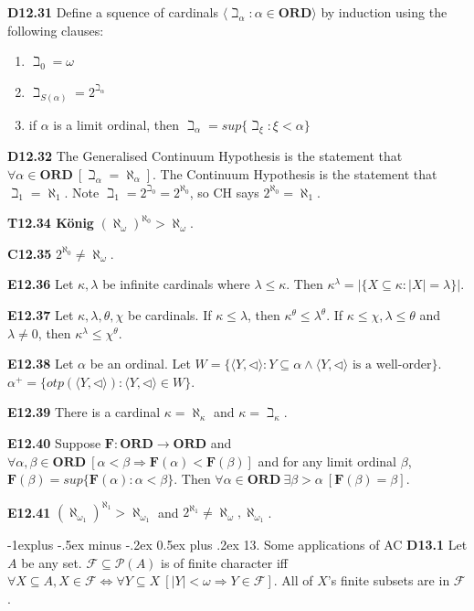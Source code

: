 \documentclass[10pt, landscape]{article}
\makeatletter
\renewcommand{\section}{\@startsection{section}{1}{0mm}%
                                {-1ex plus -.5ex minus -.2ex}%
                                {0.5ex plus .2ex}%
                                {\normalfont\large\bfseries}}
\renewcommand{\section}{\@startsection{section}{2}{0mm}%
                                {-1explus -.5ex minus -.2ex}%
                                {0.5ex plus .2ex}%
                                {\normalfont\normalsize\bfseries}}
\makeatother
\begin{document}
\begin{multicols*}{3}
\textbf{D12.31} Define a squence of cardinals $\langle\beth_\alpha:\alpha\in\mathbf{ORD}\rangle$ by induction using the following clauses:
\begin{enumerate}
    \item $\beth_0=\omega$
    \item $\beth_{S(\alpha)}=2^{\beth_\alpha}$
    \item if $\alpha$ is a limit ordinal, then $\beth_\alpha=sup\{\beth_\xi:\xi<\alpha\}$
\end{enumerate}

\textbf{D12.32} The Generalised Continuum Hypothesis is the statement that $\forall \alpha \in \mathbf{ORD}\ [\beth_\alpha=\aleph_\alpha]$. The Continuum Hypothesis is the statement that $\beth_1=\aleph_1$. Note $\beth_1=2^{\beth_0}=2^{\aleph_0}$, so CH says $2^{\aleph_0}=\aleph_1$.

\textbf{T12.34 König} $(\aleph_\omega)^{\aleph_0}>\aleph_\omega$.

\textbf{C12.35} $2^{\aleph_0}\neq\aleph_\omega$.

\textbf{E12.36} Let $\kappa,\lambda$ be infinite cardinals where $\lambda \leq \kappa$. Then $\kappa^\lambda=|\{X\subseteq\kappa:|X|=\lambda\}|$.

\textbf{E12.37} Let $\kappa, \lambda, \theta, \chi$ be cardinals. If $\kappa \leq \lambda$, then $\kappa^\theta \leq \lambda^\theta$. If $\kappa\leq\chi, \lambda \leq \theta$ and $\lambda\neq0$, then $\kappa^\lambda \leq \chi^\theta$.

\textbf{E12.38} Let $\alpha$ be an ordinal. Let $W = \{\langle Y, \lhd \rangle : Y \subseteq \alpha \land \langle Y, \lhd \rangle \text{ is a well-order}\}$. $\alpha^+=\{otp(\langle Y, \lhd \rangle):\langle Y, \lhd \rangle \in W\}$.

\textbf{E12.39} There is a cardinal $\kappa=\aleph_\kappa$ and $\kappa=\beth_\kappa$.

\textbf{E12.40} Suppose $\mathbf{F:ORD\rightarrow ORD}$ and $\forall \alpha, \beta \in \mathbf{ORD} \ [\alpha < \beta \Longrightarrow \mathbf{F}(\alpha)<\mathbf{F}(\beta)]$ and for any limit ordinal $\beta$, $\mathbf{F}(\beta)=sup\{\mathbf{F}(\alpha):\alpha<\beta\}$. Then $\forall \alpha \in \mathbf{ORD}\ \exists \beta > \alpha \ [\mathbf{F}(\beta)=\beta]$.

\textbf{E12.41} $(\aleph_{\omega_1})^{\aleph_1}>\aleph_{\omega_1}$ and $2^{\aleph_1}\neq\aleph_\omega, \aleph_{\omega_1}$.

\section{13. Some applications of AC}
\textbf{D13.1} Let $A$ be any set. $\mathcal{F}\subseteq\mathcal{P}(A)$ is of finite character iff $\forall X \subseteq A,X\in\mathcal{F}\Longleftrightarrow \forall Y \subseteq X\ [|Y|<\omega\Longrightarrow Y\in\mathcal{F}]$. All of $X$'s finite subsets are in $\mathcal{F}$.


\end{multicols*}
\end{document}

